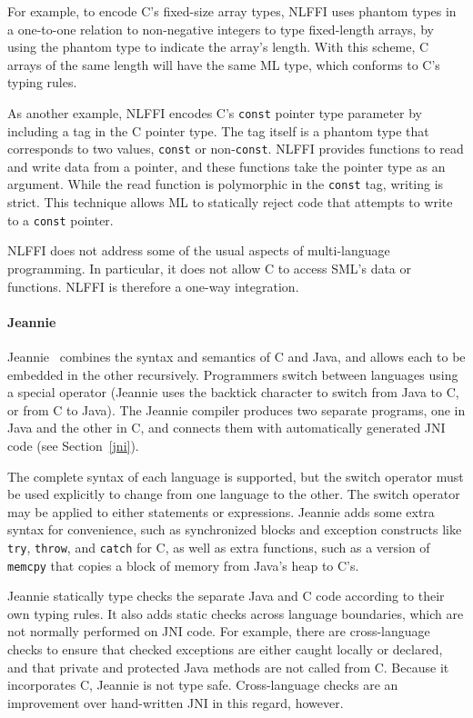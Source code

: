 For example, to encode C's fixed-size array types, NLFFI uses phantom types in a one-to-one relation to non-negative integers to type fixed-length arrays, by using the phantom type to indicate the array's length. With this scheme, C arrays of the same length will have the same ML type, which conforms to C's typing rules.

As another example, NLFFI encodes C's \texttt{const} pointer type parameter by including a tag in the C pointer type. The tag itself is a phantom type that corresponds to two values, \texttt{const} or non-\texttt{const}. NLFFI provides functions to read and write data from a pointer, and these functions take the pointer type as an argument. While the read function is polymorphic in the \texttt{const} tag, writing is strict. This technique allows ML to statically reject code that attempts to write to a \texttt{const} pointer.

NLFFI does not address some of the usual aspects of multi-language programming. In particular, it does not allow C to access SML's data or functions. NLFFI is therefore a one-way integration.


\paragraph{Jeannie}

Jeannie~\cite{hirzel07jeannie} combines the syntax and semantics of C and Java, and allows each to be embedded in the other recursively. Programmers switch between languages using a special operator (Jeannie uses the backtick character to switch from Java to C, or from C to Java). The Jeannie compiler produces two separate programs, one in Java and the other in C, and connects them with automatically generated JNI code (see Section~\ref{jni}).

The complete syntax of each language is supported, but the switch operator must be used explicitly to change from one language to the other. The switch operator may be applied to either statements or expressions. Jeannie adds some extra syntax for convenience, such as synchronized blocks and exception constructs like \texttt{try}, \texttt{throw}, and \texttt{catch} for C, as well as extra functions, such as a version of \texttt{memcpy} that copies a block of memory from Java's heap to C's.

Jeannie statically type checks the separate Java and C code according to their own typing rules. It also adds static checks across language boundaries, which are not normally performed on JNI code. For example, there are cross-language checks to ensure that checked exceptions are either caught locally or declared, and that private and protected Java methods are not called from C. Because it incorporates C, Jeannie is not type safe. Cross-language checks are an improvement over hand-written JNI in this regard, however.

